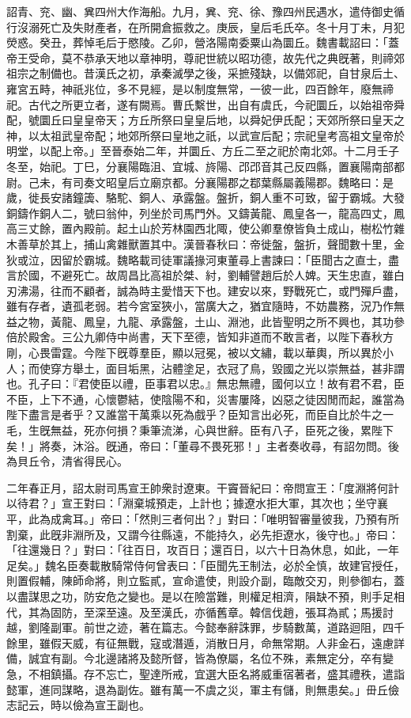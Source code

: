 \begin{pinyinscope}
詔青、兖、幽、兾四州大作海船。九月，兾、兖、徐、豫四州民遇水，遣侍御史循行沒溺死亡及失財產者，在所開倉振救之。庚辰，皇后毛氏卒。冬十月丁未，月犯熒惑。癸丑，葬悼毛后于愍陵。乙卯，營洛陽南委粟山為圜丘。魏書載詔曰：「蓋帝王受命，莫不恭承天地以章神明，尊祀世統以昭功德，故先代之典旣著，則禘郊祖宗之制備也。昔漢氏之初，承秦滅學之後，采摭殘缺，以備郊祀，自甘泉后土、雍宮五畤，神祇兆位，多不見經，是以制度無常，一彼一此，四百餘年，廢無禘祀。古代之所更立者，遂有闕焉。曹氏繫世，出自有虞氏，今祀圜丘，以始祖帝舜配，號圜丘曰皇皇帝天；方丘所祭曰皇皇后地，以舜妃伊氏配；天郊所祭曰皇天之神，以太祖武皇帝配；地郊所祭曰皇地之祇，以武宣后配；宗祀皇考高祖文皇帝於明堂，以配上帝。」至晉泰始二年，并圜丘、方丘二至之祀於南北郊。十二月壬子冬至，始祀。丁巳，分襄陽臨沮、宜城、旍陽、邔邔音其己反四縣，置襄陽南部都尉。己未，有司奏文昭皇后立廟京都。分襄陽郡之鄀葉縣屬義陽郡。魏略曰：是歲，徙長安諸鐘簴、駱駝、銅人、承露盤。盤折，銅人重不可致，留于霸城。大發銅鑄作銅人二，號曰翁仲，列坐於司馬門外。又鑄黃龍、鳳皇各一，龍高四丈，鳳高三丈餘，置內殿前。起土山於芳林園西北陬，使公卿羣僚皆負土成山，樹松竹雜木善草於其上，捕山禽雜獸置其中。漢晉春秋曰：帝徙盤，盤折，聲聞數十里，金狄或泣，因留於霸城。魏略載司徒軍議掾河東董尋上書諫曰：「臣聞古之直士，盡言於國，不避死亡。故周昌比高祖於桀、紂，劉輔譬趙后於人婢。天生忠直，雖白刃沸湯，往而不顧者，誠為時主愛惜天下也。建安以來，野戰死亡，或門殫戶盡，雖有存者，遺孤老弱。若今宮室狹小，當廣大之，猶宜隨時，不妨農務，況乃作無益之物，黃龍、鳳皇，九龍、承露盤，土山、淵池，此皆聖明之所不興也，其功參倍於殿舍。三公九卿侍中尚書，天下至德，皆知非道而不敢言者，以陛下春秋方剛，心畏雷霆。今陛下旣尊羣臣，顯以冠冕，被以文繡，載以華輿，所以異於小人；而使穿方舉土，面目垢黑，沾體塗足，衣冠了鳥，毀國之光以崇無益，甚非謂也。孔子曰：『君使臣以禮，臣事君以忠。』無忠無禮，國何以立！故有君不君，臣不臣，上下不通，心懷鬱結，使陰陽不和，災害屢降，凶惡之徒因閒而起，誰當為陛下盡言是者乎？又誰當干萬乘以死為戲乎？臣知言出必死，而臣自比於牛之一毛，生旣無益，死亦何損？秉筆流涕，心與世辭。臣有八子，臣死之後，累陛下矣！」將奏，沐浴。旣通，帝曰：「董尋不畏死邪！」主者奏收尋，有詔勿問。後為貝丘令，清省得民心。

二年春正月，詔太尉司馬宣王帥衆討遼東。干竇晉紀曰：帝問宣王：「度淵將何計以待君？」宣王對曰：「淵棄城預走，上計也；據遼水拒大軍，其次也；坐守襄平，此為成禽耳。」帝曰：「然則三者何出？」對曰：「唯明智審量彼我，乃預有所割棄，此旣非淵所及，又謂今往縣遠，不能持久，必先拒遼水，後守也。」帝曰：「往還幾日？」對曰：「往百日，攻百日；還百日，以六十日為休息，如此，一年足矣。」魏名臣奏載散騎常侍何曾表曰：「臣聞先王制法，必於全慎，故建官授任，則置假輔，陳師命將，則立監貳，宣命遣使，則設介副，臨敵交刃，則參御右，蓋以盡謀思之功，防安危之變也。是以在險當難，則權足相濟，隕缺不預，則手足相代，其為固防，至深至遠。及至漢氏，亦循舊章。韓信伐趙，張耳為貳；馬援討越，劉隆副軍。前世之迹，著在篇志。今懿奉辭誅罪，步騎數萬，道路迴阻，四千餘里，雖假天威，有征無戰，寇或潛遁，消散日月，命無常期。人非金石，遠慮詳備，誠宜有副。今北邊諸將及懿所督，皆為僚屬，名位不殊，素無定分，卒有變急，不相鎮攝。存不忘亡，聖達所戒，宜選大臣名將威重宿著者，盛其禮秩，遣詣懿軍，進同謀略，退為副佐。雖有萬一不虞之災，軍主有儲，則無患矣。」毌丘儉志記云，時以儉為宣王副也。


\end{pinyinscope}
